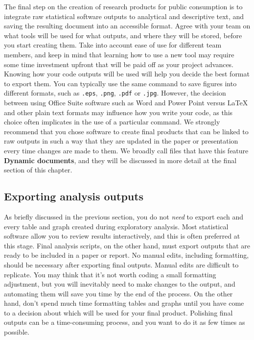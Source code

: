 The final step on the creation of research products for public consumption is to
integrate raw statistical software outputs to analytical and descriptive text,
and saving the resulting document into an accessible format.
Agree with your team on what tools will be used for what outputs, 
and where they will be stored, before you start creating them.
Take into account ease of use for different team members, and
keep in mind that learning how to use a new tool may require some
time investment upfront that will be paid off as your project advances.
Knowing how your code outputs will be used will help you decide the best format to export them.
You can typically use the same command to save figures into different formats, 
such as \texttt{.eps}, \texttt{.png}, \texttt{.pdf} or \texttt{.jpg}.
However, the decision between using Office Suite software such as Word and Power Point
versus {\LaTeX} and other plain text formats may influence how you write your code,
as this choice often implicates in the use of a particular command.
We strongly recommend that you chose software to create final products
that can be linked to raw outputs in such a way that they are updated
in the paper or presentation every time changes are made to them.
We broadly call files that have this feature \textbf{Dynamic documents},
and they will be discussed in more detail at the final section of this chapter.


\subsection{Exporting analysis outputs}

As briefly discussed in the previous section,
you do not \textit{need} to export each and every table and graph created during exploratory analysis.
Most statistical software allow you to review results interactively,
and this is often preferred at this stage.
Final analysis scripts, on the other hand, must export outputs
that are ready to be included in a paper or report.
No manual edits, including formatting, 
should be necessary after exporting final outputs.
Manual edits are difficult to replicate.
You may think that it's not worth coding a small formatting adjustment,
but you will inevitably need to make changes to the output,
and automating them will save you time by the end of the process.
On the other hand, don't spend much time formatting tables and graphs until 
you have come to a decision about which will be used for your final product.
Polishing final outputs can be a time-consuming process,
and you want to do it as few times as possible.

